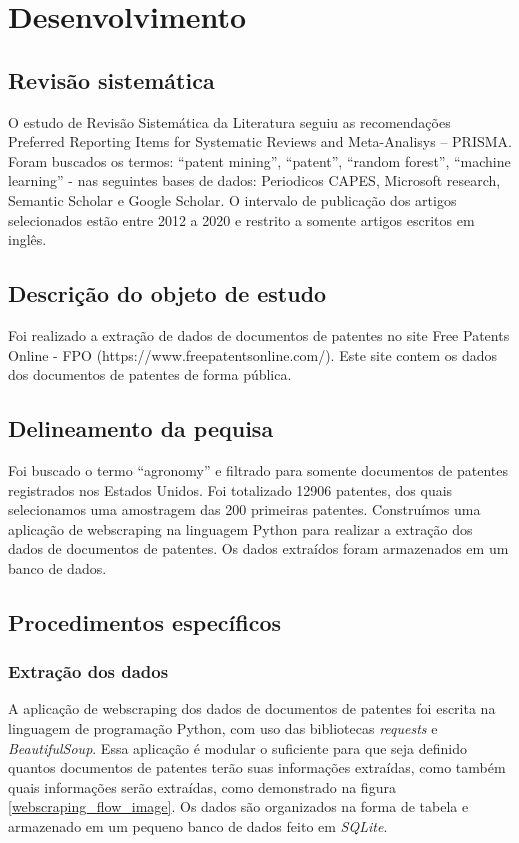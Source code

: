

\chapter{Desenvolvimento}\label{cap_exemplos}

\section{Revisão sistemática}
O estudo de Revisão Sistemática da Literatura seguiu as recomendações Preferred Reporting Items for Systematic Reviews and Meta-Analisys – PRISMA.
Foram buscados os termos: “patent mining”, “patent”, “random forest”, “machine learning” - nas seguintes bases de dados: Periodicos CAPES, Microsoft research, Semantic Scholar e Google Scholar. O intervalo de publicação dos artigos selecionados estão entre 2012 a 2020 e restrito a somente artigos escritos em inglês.

\section{Descrição do objeto de estudo}
Foi realizado a extração de dados de documentos de patentes no site Free Patents Online - FPO (https://www.freepatentsonline.com/). Este site contem os dados dos documentos de patentes de forma pública.

\section{Delineamento da pequisa}
Foi buscado o termo “agronomy” e filtrado para somente documentos de patentes registrados nos Estados Unidos. Foi totalizado 12906 patentes, dos quais selecionamos uma amostragem das 200 primeiras patentes. Construímos uma aplicação de webscraping na linguagem Python para realizar a extração dos dados de documentos de patentes.  Os dados extraídos foram armazenados em um banco de dados.

\section{Procedimentos específicos}

\subsection{Extração dos dados}
A aplicação de webscraping dos dados de documentos de patentes foi escrita na linguagem de programação Python, com uso das bibliotecas \textit{requests} e \textit{BeautifulSoup}. Essa aplicação é modular o suficiente para que seja definido quantos documentos de patentes terão suas informações extraídas, como também quais informações serão extraídas, como demonstrado na figura \ref{webscraping_flow_image}. Os dados são organizados na forma de tabela e armazenado em um pequeno banco de dados feito em \textit{SQLite}.

